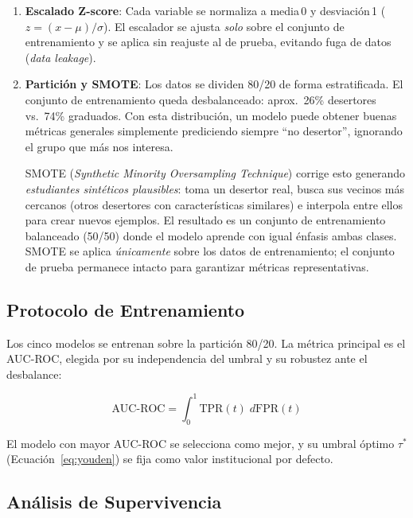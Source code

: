 \documentclass[12pt]{article}
\begin{document}
{\begin{enumerate}[label=\textbf{E\arabic*.}]
    \item \textbf{Escalado Z-score}: Cada variable se normaliza a media\,0 y
    desviación\,1 ($z = (x - \mu) / \sigma$). El escalador se ajusta \emph{solo} sobre
    el conjunto de entrenamiento y se aplica sin reajuste al de prueba, evitando
    fuga de datos (\textit{data leakage}).

    \item \textbf{Partición y SMOTE}: Los datos se dividen 80/20 de forma estratificada.
    El conjunto de entrenamiento queda desbalanceado: aprox.\ 26\% desertores vs.\ 74\%
    graduados. Con esta distribución, un modelo puede obtener buenas métricas generales
    simplemente prediciendo siempre ``no desertor'', ignorando el grupo que más nos
    interesa.

    SMOTE (\textit{Synthetic Minority Oversampling Technique}) corrige esto generando
    \emph{estudiantes sintéticos plausibles}: toma un desertor real, busca sus vecinos
    más cercanos (otros desertores con características similares) e interpola entre
    ellos para crear nuevos ejemplos. El resultado es un conjunto de entrenamiento
    balanceado (50/50) donde el modelo aprende con igual énfasis ambas clases.
    SMOTE se aplica \emph{únicamente} sobre los datos de entrenamiento; el conjunto
    de prueba permanece intacto para garantizar métricas representativas.
\end{enumerate}

\subsection{Protocolo de Entrenamiento}

Los cinco modelos se entrenan sobre la partición 80/20. La métrica principal es el
AUC-ROC, elegida por su independencia del umbral y su robustez ante el desbalance:

\begin{equation}
    \text{AUC-ROC} = \int_0^1 \text{TPR}(t)\; d\text{FPR}(t)
    \label{eq:aucroc}
\end{equation}

El modelo con mayor AUC-ROC se selecciona como mejor, y su umbral óptimo $\tau^*$
(Ecuación~\ref{eq:youden}) se fija como valor institucional por defecto.

\subsection{Análisis de Supervivencia}

}
\end{document}
